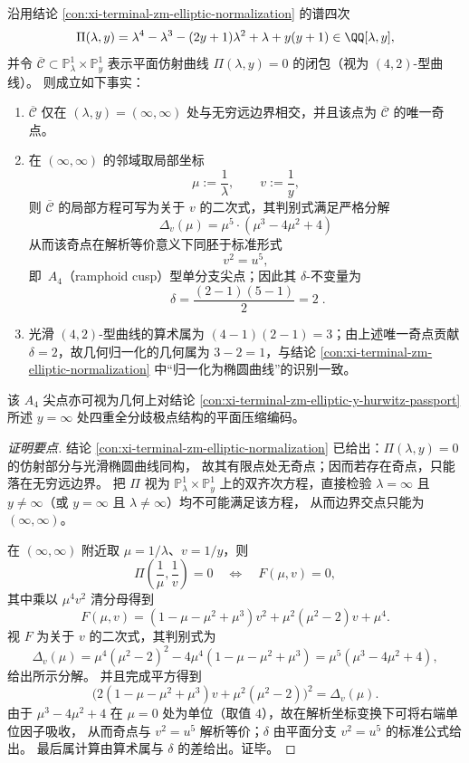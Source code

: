 \begin{conclusion}[谱曲线在无穷远处的唯一奇点：\texorpdfstring{$A_4$}{A4} 型单分支尖点与 \texorpdfstring{$\delta=2$}{delta=2}]\label{con:xi-terminal-zm-spectral-curve-infty-a4-cusp}
沿用结论 \ref{con:xi-terminal-zm-elliptic-normalization} 的谱四次
\[
\Pi(\lambda,y)=\lambda^4-\lambda^3-(2y+1)\lambda^2+\lambda+y(y+1)\in\QQ[\lambda,y],
\]
并令 \(\overline{\mathcal C}\subset \mathbb P^1_\lambda\times \mathbb P^1_y\) 表示平面仿射曲线 \(\Pi(\lambda,y)=0\) 的闭包（视为 \((4,2)\)-型曲线）。
则成立如下事实：
\begin{enumerate}
  \item \(\overline{\mathcal C}\) 仅在 \((\lambda,y)=(\infty,\infty)\) 处与无穷远边界相交，并且该点为 \(\overline{\mathcal C}\) 的唯一奇点。
  \item 在 \((\infty,\infty)\) 的邻域取局部坐标
  \[
  \mu:=\frac{1}{\lambda},\qquad v:=\frac{1}{y},
  \]
  则 \(\overline{\mathcal C}\) 的局部方程可写为关于 \(v\) 的二次式，其判别式满足严格分解
  \[
  \boxed{\;\Delta_v(\mu)=\mu^5\cdot(\mu^3-4\mu^2+4)\;}
  \]
  从而该奇点在解析等价意义下同胚于标准形式
  \[
  v^2=u^5,
  \]
  即 \(\,A_4\)（ramphoid cusp）型单分支尖点；因此其 \(\delta\)-不变量为
  \[
  \boxed{\;\delta=\frac{(2-1)(5-1)}{2}=2\; }.
  \]
  \item 光滑 \((4,2)\)-型曲线的算术属为 \((4-1)(2-1)=3\)；由上述唯一奇点贡献 \(\delta=2\)，故几何归一化的几何属为 \(3-2=1\)，与结论 \ref{con:xi-terminal-zm-elliptic-normalization} 中“归一化为椭圆曲线”的识别一致。
\end{enumerate}
该 \(A_4\) 尖点亦可视为几何上对结论 \ref{con:xi-terminal-zm-elliptic-y-hurwitz-passport} 所述 \(y=\infty\) 处四重全分歧极点结构的平面压缩编码。
\end{conclusion}
\begin{proof}[证明要点]
结论 \ref{con:xi-terminal-zm-elliptic-normalization} 已给出：\(\Pi(\lambda,y)=0\) 的仿射部分与光滑椭圆曲线同构，
故其有限点处无奇点；因而若存在奇点，只能落在无穷远边界。
把 \(\Pi\) 视为 \(\mathbb P^1_\lambda\times \mathbb P^1_y\) 上的双齐次方程，直接检验 \(\lambda=\infty\) 且 \(y\neq\infty\)（或 \(y=\infty\) 且 \(\lambda\neq\infty\)）均不可能满足该方程，
从而边界交点只能为 \((\infty,\infty)\)。
\par
在 \((\infty,\infty)\) 附近取 \(\mu=1/\lambda\)、\(v=1/y\)，则
\[
\Pi\!\left(\frac{1}{\mu},\frac{1}{v}\right)=0
\quad\Longleftrightarrow\quad
F(\mu,v)=0,
\]
其中乘以 \(\mu^4v^2\) 清分母得到
\[
F(\mu,v)
=(1-\mu-\mu^2+\mu^3)v^2+\mu^2(\mu^2-2)v+\mu^4.
\]
视 \(F\) 为关于 \(v\) 的二次式，其判别式为
\[
\Delta_v(\mu)=\mu^4(\mu^2-2)^2-4\mu^4(1-\mu-\mu^2+\mu^3)
=\mu^5(\mu^3-4\mu^2+4),
\]
给出所示分解。
并且完成平方得到
\[
\bigl(2(1-\mu-\mu^2+\mu^3)v+\mu^2(\mu^2-2)\bigr)^2=\Delta_v(\mu).
\]
由于 \(\mu^3-4\mu^2+4\) 在 \(\mu=0\) 处为单位（取值 \(4\)），故在解析坐标变换下可将右端单位因子吸收，
从而奇点与 \(v^2=u^5\) 解析等价；\(\delta\) 由平面分支 \(v^2=u^5\) 的标准公式给出。
最后属计算由算术属与 \(\delta\) 的差给出。证毕。
\end{proof}

